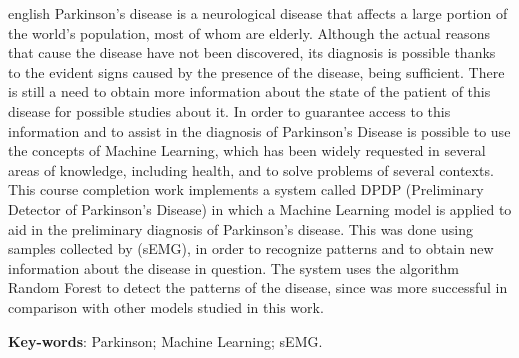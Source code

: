 \begin{resumo}[Abstract]

 \begin{otherlanguage*}{english}
  Parkinson's disease is a neurological disease that affects a large portion of the world's population, most of whom are elderly. Although the actual reasons that cause the disease have not been discovered, its diagnosis is possible thanks to the evident signs caused by the presence of the disease, being sufficient. There is still a need to obtain more information about the state of the patient of this disease for possible studies about it. In order to guarantee access to this information and to assist in the diagnosis of Parkinson's Disease is possible to use the concepts of Machine Learning, which has been widely requested in several areas of knowledge, including health, and to solve problems of several contexts. This course completion work implements a system called DPDP (Preliminary Detector of Parkinson's Disease) in which a Machine Learning model is applied to aid in the preliminary diagnosis of Parkinson's disease. This was done using samples collected by (sEMG), in order to recognize patterns and to obtain new information about the disease in question. The system uses the algorithm Random Forest to detect the patterns of the disease, since was more successful in comparison with other models studied in this work.

   \vspace{\onelineskip}
 
   \noindent 
   \textbf{Key-words}: Parkinson; Machine Learning; sEMG.
 \end{otherlanguage*}
\end{resumo}
